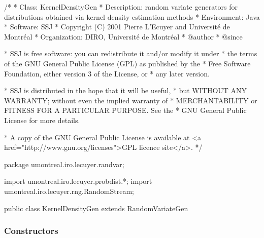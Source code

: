 \begin{code}
\begin{hide}
/*
 * Class:        KernelDensityGen
 * Description:  random variate generators for distributions obtained via
                 kernel density estimation methods
 * Environment:  Java
 * Software:     SSJ 
 * Copyright (C) 2001  Pierre L'Ecuyer and Université de Montréal
 * Organization: DIRO, Université de Montréal
 * @author       
 * @since

 * SSJ is free software: you can redistribute it and/or modify it under
 * the terms of the GNU General Public License (GPL) as published by the
 * Free Software Foundation, either version 3 of the License, or
 * any later version.

 * SSJ is distributed in the hope that it will be useful,
 * but WITHOUT ANY WARRANTY; without even the implied warranty of
 * MERCHANTABILITY or FITNESS FOR A PARTICULAR PURPOSE.  See the
 * GNU General Public License for more details.

 * A copy of the GNU General Public License is available at
   <a href="http://www.gnu.org/licenses">GPL licence site</a>.
 */
\end{hide}
package umontreal.iro.lecuyer.randvar;\begin{hide}
import umontreal.iro.lecuyer.probdist.*;
import umontreal.iro.lecuyer.rng.RandomStream;\end{hide}

public class KernelDensityGen extends RandomVariateGen\begin{hide} {

   protected RandomVariateGen kernelGen;
   protected double bandwidth;
   protected boolean positive;   // If we want positive reflection.
\end{hide}
\end{code}
\subsubsection* {Constructors}

